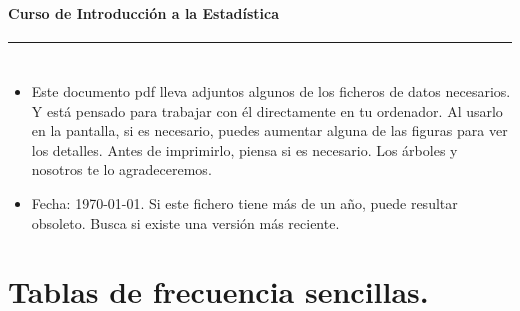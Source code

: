 \documentclass[10pt,a4paper]{article}\usepackage[]{graphicx}\usepackage[]{color}
\newcounter {cont01}
\begin{document}

\paragraph{\hspace{6.3cm}Curso de Introducción a la Estadística\\[2mm]} \noindent\hrule

\setcounter{section}{0}
\section*{\hspace{-0.1cm}}

%

\begin{itemize}
  \item Este documento pdf lleva adjuntos algunos de los ficheros de datos necesarios. Y está
      pensado para trabajar con él directamente en tu ordenador. Al usarlo en la pantalla, si es
      necesario, puedes aumentar alguna de las figuras para ver los detalles. Antes de
      imprimirlo, piensa si es necesario. Los árboles y nosotros te lo agradeceremos.
  \item Fecha: \today. Si este fichero tiene más de un año, puede resultar obsoleto. Busca si
      existe una versión más reciente.
\end{itemize}
\setcounter{tocdepth}{1} \tableofcontents

\section{Tablas de frecuencia sencillas.}
\label{tut01:sec:TablasFrecuenciaSencillas}
\end{document}
